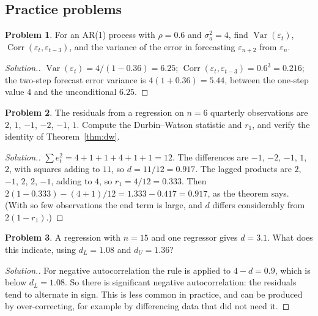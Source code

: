 \documentclass[11pt,a4paper]{article}
\numberwithin{equation}{section}
\theoremstyle{definition}
\newtheorem{problemx}{Problem}[subsection]
\newenvironment{problem}{\begin{problemx}}{\end{problemx}}
\newenvironment{solution}
  {\renewcommand{\qedsymbol}{}\begin{proof}[\textit{Solution}.]}
  {\end{proof}}
\begin{document}
\subsection{Practice problems}
\begin{problem}\label{prob:ar-two-step}
For an AR(1) process with $\rho = 0.6$ and $\sigma_a^2 = 4$, find $\operatorname{Var}(\varepsilon_t)$, $\operatorname{Corr}(\varepsilon_t, \varepsilon_{t-3})$, and the variance of the
error in forecasting $\varepsilon_{n+2}$ from $\varepsilon_n$.
\end{problem}

\begin{solution}
$\operatorname{Var}(\varepsilon_t) = 4/(1 - 0.36) = 6.25$; $\operatorname{Corr}(\varepsilon_t, \varepsilon_{t-3}) = 0.6^3 = 0.216$; the two-step forecast error variance is
$4(1 + 0.36) = 5.44$, between the one-step value $4$ and the unconditional $6.25$.
\end{solution}

\begin{problem}\label{prob:dw-calc}
The residuals from a regression on $n = 6$ quarterly observations are $2$, $1$, $-1$, $-2$, $-1$, $1$. Compute the
Durbin--Watson statistic and $r_1$, and verify the identity of Theorem~\ref{thm:dw}.
\end{problem}

\begin{solution}
$\sum e_t^2 = 4 + 1 + 1 + 4 + 1 + 1 = 12$. The differences are $-1$, $-2$, $-1$, $1$, $2$, with squares adding to $11$, so $d = 11/12 = 0.917$.
The lagged products are $2$, $-1$, $2$, $2$, $-1$, adding to $4$, so $r_1 = 4/12 = 0.333$. Then
$2(1 - 0.333) - (4 + 1)/12 = 1.333 - 0.417 = 0.917$, as the theorem says. (With so few observations the end term is large,
and $d$ differs considerably from $2(1 - r_1)$.)
\end{solution}

\begin{problem}\label{prob:negative-dw}
A regression with $n = 15$ and one regressor gives $d = 3.1$. What does this indicate, using $d_L = 1.08$ and $d_U = 1.36$?
\end{problem}

\begin{solution}
For negative autocorrelation the rule is applied to $4 - d = 0.9$, which is below $d_L = 1.08$. So there is significant
negative autocorrelation: the residuals tend to alternate in sign. This is less common in practice, and can
be produced by over-correcting, for example by differencing data that did not need it.
\end{solution}
\end{document}

